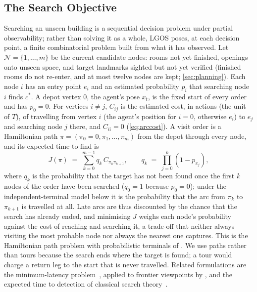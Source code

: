 \documentclass[10pt]{article}
\newcommand{\ours}{LGOS\xspace}
\newcommand{\N}{\mathcal{N}}
\newcommand{\cstar}{c^{*}}
\begin{document}
\subsection{The Search Objective}
\label{sec:problem-objective}

Searching an unseen building is a sequential decision problem under partial observability; rather than solving it as
a whole, \ours poses, at each decision point, a finite combinatorial problem built from what it has observed. Let
$\N = \{1, \dots, m\}$ be the current candidate nodes: rooms not yet finished, openings onto unseen space, and target
landmarks sighted but not yet verified (finished rooms do not re-enter, and at most twelve nodes are kept;
\cref{sec:planning}). Each node $i$ has an entry point $e_i$ and an estimated probability $p_i$ that searching node $i$
finds $\cstar$. A depot vertex $0$, the agent's pose $x_t$, is the fixed start of every order and has $p_0 = 0$. For
vertices $i \neq j$, $C_{ij}$ is the estimated cost, in actions (the unit of $T$), of travelling from vertex $i$ (the
agent's position for $i = 0$, otherwise $e_i$) to $e_j$ and searching node $j$ there, and $C_{ii} = 0$
(\cref{eq:arccost}). A visit order is a Hamiltonian path $\pi = (\pi_0 = 0, \pi_1, \dots, \pi_m)$ from the depot
through every node, and its expected time-to-find is
\begin{equation}
  J(\pi) \;=\; \sum_{k=0}^{m-1} q_k \, C_{\pi_k \pi_{k+1}},
  \qquad
  q_k \;=\; \prod_{j=0}^{k} \left(1 - p_{\pi_j}\right),
  \label{eq:objective}
\end{equation}
where $q_k$ is the probability that the target has not been found once the first $k$ nodes of the order have been
searched ($q_0 = 1$ because $p_0 = 0$); under the independent-terminal model below it is the probability that the arc
from $\pi_k$ to $\pi_{k+1}$ is travelled at all. Late arcs are thus discounted by the chance that the search has already
ended, and minimising $J$ weighs each node's probability against the cost of reaching and searching it, a trade-off
that neither always visiting the most probable node nor always the nearest one captures. This is the Hamiltonian path
problem with probabilistic terminals of \citet{lyu2026rpt}. We use paths rather than tours because the search ends
where the target is found; a tour would charge a return leg to the start that is never travelled. Related formulations
are the minimum-latency problem~\citep{blum1994minimum}, applied to frontier viewpoints by \citet{liu2026global}, and the
expected time to detection of classical search theory~\citep{stone1975theory}.
\end{document}
